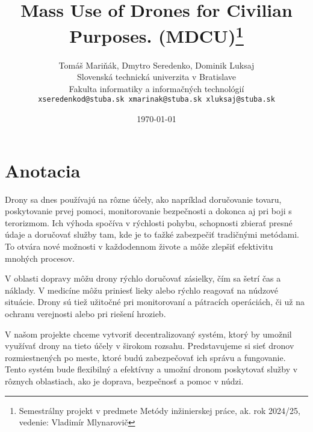 \documentclass[10pt,a4paper]{article}
\title{Mass Use of Drones for Civilian Purposes. (\textbf{MDCU})\thanks{Semestrálny projekt v predmete Metódy inžinierskej práce, ak. rok 2024/25, vedenie: Vladimír Mlynarovič}}
\author{Tomáš Mariňák, Dmytro Seredenko, Dominik Luksaj\\[2pt]
	{\small Slovenská technická univerzita v Bratislave}\\
	{\small Fakulta informatiky a informačných technológií}\\
	{\small \texttt{xseredenkod@stuba.sk xmarinak@stuba.sk xluksaj@stuba.sk}}}
\date{\small \today}
\begin{document}
\maketitle

\section{Anotacia}

 Drony sa dnes používajú na rôzne účely, ako napríklad doručovanie tovaru, poskytovanie prvej pomoci, monitorovanie bezpečnosti a dokonca aj pri boji s terorizmom. Ich výhoda spočíva v rýchlosti pohybu, schopnosti zbierať presné údaje a doručovať služby tam, kde je to ťažké zabezpečiť tradičnými metódami. To otvára nové možnosti v každodennom živote a môže zlepšiť efektivitu mnohých procesov.

 V oblasti dopravy môžu drony rýchlo doručovať zásielky, čím sa šetrí čas a náklady. V medicíne môžu priniesť lieky alebo rýchlo reagovať na núdzové situácie. Drony sú tiež užitočné pri monitorovaní a pátracích operáciách, či už na ochranu verejnosti alebo pri riešení hrozieb.

 V našom projekte chceme vytvoriť decentralizovaný systém, ktorý by umožnil využívať drony na tieto účely v širokom rozsahu. Predstavujeme si sieť dronov rozmiestnených po meste, ktoré budú zabezpečovať ich správu a fungovanie. Tento systém bude flexibilný a efektívny a umožní dronom poskytovať služby v rôznych oblastiach, ako je doprava, bezpečnosť a pomoc v núdzi.
\end{document}
